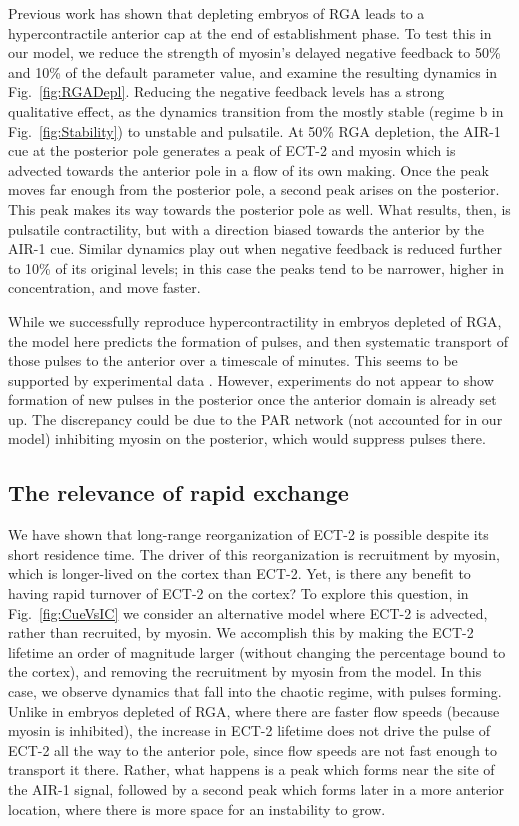\documentclass[11pt]{article}
\begin{document}
Previous work \citep{schonegg2007rho, zanin2013conserved, michaux2018excitable} has shown that depleting embryos of RGA leads to a hypercontractile anterior cap at the end of establishment phase. To test this in our model, we reduce the strength of myosin's delayed negative feedback to 50\% and 10\% of the default parameter value, and examine the resulting dynamics in Fig.\ \ref{fig:RGADepl}. Reducing the negative feedback levels has a strong qualitative effect, as the dynamics transition from the mostly stable (regime b in Fig.\ \ref{fig:Stability}) to unstable and pulsatile. At 50\% RGA depletion, the AIR-1 cue at the posterior pole generates a peak of ECT-2 and myosin which is advected towards the anterior pole in a flow of its own making. Once the peak moves far enough from the posterior pole, a second peak arises on the posterior. This peak makes its way towards the posterior pole as well. What results, then, is pulsatile contractility, but with a direction biased towards the anterior by the AIR-1 cue. Similar dynamics play out when negative feedback is reduced further to 10\% of its original levels; in this case the peaks tend to be narrower, higher in concentration, and move faster. 

While we successfully reproduce hypercontractility in embryos depleted of RGA, the model here predicts the formation of pulses, and then systematic transport of those pulses to the anterior over a timescale of minutes. This seems to be supported by experimental data \citep{michaux2018excitable}. However, experiments do not appear to show formation of new pulses in the posterior once the anterior domain is already set up. The discrepancy could be due to the PAR network (not accounted for in our model) inhibiting myosin on the posterior, which would suppress pulses there. 

\subsection{The relevance of rapid exchange}
We have shown that long-range reorganization of ECT-2 is possible despite its short residence time. The driver of this reorganization is recruitment by myosin, which is longer-lived on the cortex than ECT-2. Yet, is there any benefit to having rapid turnover of ECT-2 on the cortex? To explore this question, in Fig.\ \ref{fig:CueVsIC} we consider an alternative model where ECT-2 is advected, rather than recruited, by myosin. We accomplish this by making the ECT-2 lifetime an order of magnitude larger (without changing the percentage bound to the cortex), and removing the recruitment by myosin from the model. In this case, we observe dynamics that fall into the chaotic regime, with pulses forming. Unlike in embryos depleted of RGA, where there are faster flow speeds (because myosin is inhibited), the increase in ECT-2 lifetime does not drive the pulse of ECT-2 all the way to the anterior pole, since flow speeds are not fast enough to transport it there. Rather, what happens is a peak which forms near the site of the AIR-1 signal, followed by a second peak which forms later in a more anterior location, where there is more space for an instability to grow.
\end{document}

